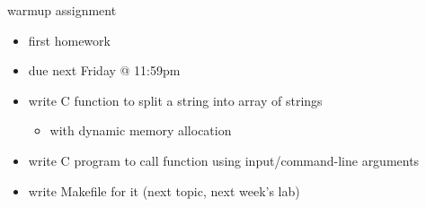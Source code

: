 \begin{frame}{warmup assignment}
\begin{itemize}
\item first homework
\item due next Friday @ 11:59pm
\vspace{.5cm}
\item write C function to split a string into array of strings
    \begin{itemize}
    \item with dynamic memory allocation
    \end{itemize}
\item write C program to call function using input/command-line arguments
\item write Makefile for it (next topic, next week's lab)
\end{itemize}
\end{frame}
